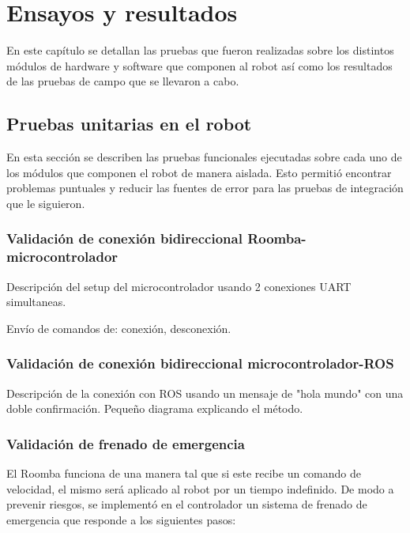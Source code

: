 
\chapter{Ensayos y resultados} %

\label{Capitulo4}

En este capítulo se detallan las pruebas que fueron realizadas sobre los distintos módulos de hardware y software que componen al robot así como los resultados de las pruebas de campo que se llevaron a cabo.

\section{Pruebas unitarias en el robot}

En esta sección se describen las pruebas funcionales ejecutadas sobre cada uno de los módulos que componen el robot de manera aislada. Esto permitió encontrar problemas puntuales y reducir las fuentes de error para las pruebas de integración que le siguieron.

\subsection{Validación de conexión bidireccional Roomba-microcontrolador}

Descripción del setup del microcontrolador usando 2 conexiones UART simultaneas.

Envío de comandos de: conexión, desconexión.

\subsection{Validación de conexión bidireccional microcontrolador-ROS}

Descripción de la conexión con ROS usando un mensaje de "hola mundo" con una doble confirmación. Pequeño diagrama explicando el método.

\subsection{Validación de frenado de emergencia}

El Roomba funciona de una manera tal que si este recibe un comando de velocidad, el mismo será aplicado al robot por un tiempo indefinido. De modo a prevenir riesgos, se implementó en el controlador un sistema de frenado de emergencia que responde a los siguientes pasos:

